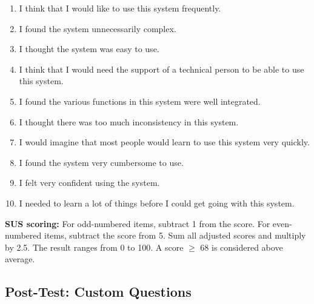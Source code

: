 \documentclass[12pt, titlepage]{article}
\begin{document}
\begin{enumerate}
  \item I think that I would like to use this system frequently.
  \item I found the system unnecessarily complex.
  \item I thought the system was easy to use.
  \item I think that I would need the support of a technical person to be able to use this system.
  \item I found the various functions in this system were well integrated.
  \item I thought there was too much inconsistency in this system.
  \item I would imagine that most people would learn to use this system very quickly.
  \item I found the system very cumbersome to use.
  \item I felt very confident using the system.
  \item I needed to learn a lot of things before I could get going with this system.
\end{enumerate}

\noindent \textbf{SUS scoring:} For odd-numbered items, subtract 1 from the score. For even-numbered items, subtract the score from 5. Sum all adjusted scores and multiply by 2.5. The result ranges from 0 to 100. A score $\geq$ 68 is considered above average.

\subsection{Post-Test: Custom Questions}
\end{document}
